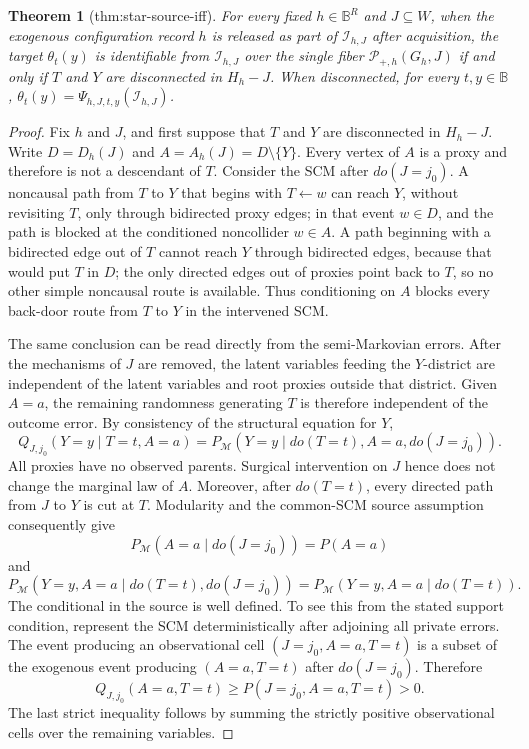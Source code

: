 \documentclass{article}
\newtheorem{theorem}{Theorem}
\begin{document}
\begin{theorem}[thm:star-source-iff]\label{thm:star-source-iff}
For every fixed \(h\in\mathbb B^R\) and \(J\subseteq W\), when the exogenous configuration record \(h\) is released as part of \(\mathcal I_{h,J}\) after acquisition, the target \(\theta_t(y)\) is identifiable from \(\mathcal I_{h,J}\) over the single fiber \(\mathcal P_{+,h}(G_h,J)\) if and only if \(T\) and \(Y\) are disconnected in \(H_h-J\). When disconnected, for every \(t,y\in\mathbb B\), \(\theta_t(y)=\Psi_{h,J,t,y}(\mathcal I_{h,J})\).
\end{theorem}
\begin{proof}
Fix \(h\) and \(J\), and first suppose that \(T\) and \(Y\) are disconnected in \(H_h-J\).  Write \(D=D_h(J)\) and \(A=A_h(J)=D\setminus\{Y\}\).  Every vertex of \(A\) is a proxy and therefore is not a descendant of \(T\).  Consider the SCM after \(do(J=j_0)\).  A noncausal path from \(T\) to \(Y\) that begins with \(T\leftarrow w\) can reach \(Y\), without revisiting \(T\), only through bidirected proxy edges; in that event \(w\in D\), and the path is blocked at the conditioned noncollider \(w\in A\).  A path beginning with a bidirected edge out of \(T\) cannot reach \(Y\) through bidirected edges, because that would put \(T\) in \(D\); the only directed edges out of proxies point back to \(T\), so no other simple noncausal route is available.  Thus conditioning on \(A\) blocks every back-door route from \(T\) to \(Y\) in the intervened SCM.

The same conclusion can be read directly from the semi-Markovian errors.  After the mechanisms of \(J\) are removed, the latent variables feeding the \(Y\)-district are independent of the latent variables and root proxies outside that district.  Given \(A=a\), the remaining randomness generating \(T\) is therefore independent of the outcome error.  By consistency of the structural equation for \(Y\),
\[
 Q_{J,j_0}(Y=y\mid T=t,A=a)
 =P_{\mathcal M}(Y=y\mid do(T=t),A=a,do(J=j_0)).
\]
All proxies have no observed parents.  Surgical intervention on \(J\) hence does not change the marginal law of \(A\).  Moreover, after \(do(T=t)\), every directed path from \(J\) to \(Y\) is cut at \(T\).  Modularity and the common-SCM source assumption consequently give
\[
 P_{\mathcal M}(A=a\mid do(J=j_0))=P(A=a)
\]
and
\[
 P_{\mathcal M}(Y=y,A=a\mid do(T=t),do(J=j_0))
 =P_{\mathcal M}(Y=y,A=a\mid do(T=t)).
\]
The conditional in the source is well defined.  To see this from the stated support condition, represent the SCM deterministically after adjoining all private errors.  The event producing an observational cell \((J=j_0,A=a,T=t)\) is a subset of the exogenous event producing \((A=a,T=t)\) after \(do(J=j_0)\).  Therefore
\[
 Q_{J,j_0}(A=a,T=t)\ge P(J=j_0,A=a,T=t)>0.
\]
The last strict inequality follows by summing the strictly positive observational cells over the remaining variables.


\end{proof}
\end{document}
